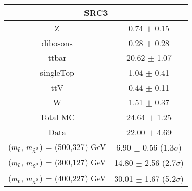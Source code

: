 \begin{tabular}{c|c}
\hline\hline
\multicolumn{2}{c}{\bf SRC3 } \\ \hline 
Z & 0.74 $\pm$ 0.15 \\
dibosons & 0.28 $\pm$ 0.28 \\
ttbar & 20.62 $\pm$ 1.07 \\
singleTop & 1.04 $\pm$ 0.41 \\
ttV & 0.44 $\pm$ 0.11 \\
W & 1.51 $\pm$ 0.37 \\
\hline
Total MC & 24.64 $\pm$ 1.25 \\
Data & 22.00 $\pm$ 4.69 \\
\hline
 ($m_{\tilde{t}}$, $\mLSP$) = (500,327) GeV & 6.90 $\pm$ 0.56 (1.3$\sigma$) \\
\hline
 ($m_{\tilde{t}}$, $\mLSP$) = (300,127) GeV & 14.80 $\pm$ 2.56 (2.7$\sigma$) \\
\hline
 ($m_{\tilde{t}}$, $\mLSP$) = (400,227) GeV & 30.01 $\pm$ 1.67 (5.2$\sigma$) \\
\hline\hline
\end{tabular}

